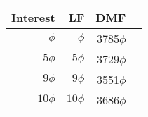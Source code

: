 \begin{tabular}{r|rrr}
Interest & LF&DMF \\
\hline
 $\phi$&   $\phi$&  3785$\phi$  \\
 $5\phi$&  $5\phi$& 3729$\phi$\\
$9\phi$ & $9\phi$ & 3551$\phi$  \\
 $10\phi$& $10\phi$& 3686$\phi$ \\
\end{tabular}